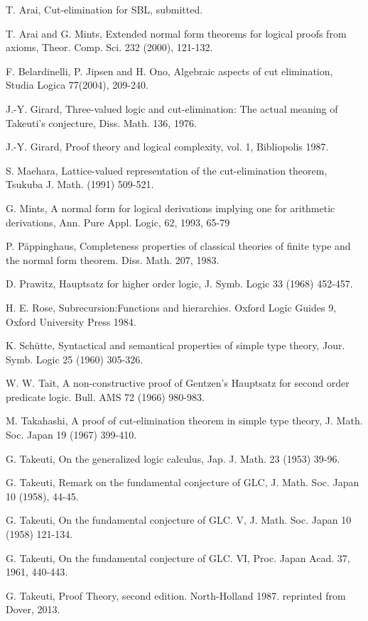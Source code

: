 \documentclass{article}
\begin{document}
\begin{thebibliography}{99}

T. Arai, 
Cut-elimination for {\sf SBL},
submitted.

T. Arai and G. Mints,  Extended normal form theorems for logical proofs from axioms,
Theor. Comp. Sci. 232 (2000), 121-132.

 F. Belardinelli, P. Jipsen and H. Ono,
Algebraic aspects of cut elimination, Studia Logica 77(2004), 209-240.

J.-Y. Girard,
Three-valued logic and cut-elimination: The actual meaning of Takeuti's conjecture,
Diss. Math. 136, 1976.

J.-Y. Girard,
Proof theory and logical complexity, vol. 1,
Bibliopolis 1987.

S. Maehara,
Lattice-valued representation of the cut-elimination theorem,
Tsukuba J. Math. (1991) 509-521.

 G. Mints, 
A normal form for logical derivations implying one for arithmetic derivations, 
Ann. Pure Appl. Logic, 62, 1993, 65-79


P. P\"appinghaus, 
Completeness properties of classical theories of finite type and the normal form theorem.
Diss. Math. 207, 1983.

D. Prawitz,
Hauptsatz for higher order logic,
J. Symb. Logic 33 (1968) 452-457.

H. E. Rose,
Subrecursion:Functions and hierarchies. Oxford Logic Guides 9, Oxford University Press 1984.

K. Sch\"utte,
Syntactical and semantical properties of simple type theory,
Jour. Symb. Logic 25 (1960) 305-326.

W. W. Tait,
A non-constructive proof of Gentzen's Hauptsatz for second order predicate logic.
Bull. AMS 72 (1966) 980-983.

M. Takahashi,
A proof of cut-elimination theorem in simple type theory,
J. Math. Soc. Japan 19 (1967) 399-410.

G. Takeuti, 
On the generalized logic calculus,
Jap. J. Math. 23 (1953) 39-96.

G. Takeuti,
Remark on the fundamental conjecture of GLC,
J. Math. Soc. Japan 10 (1958), 44-45.

G. Takeuti,
On the fundamental conjecture of GLC. V,
J. Math. Soc. Japan 10 (1958) 121-134.

G. Takeuti, 
On the fundamental conjecture of GLC. VI,
Proc. Japan Acad. 37, 1961, 440-443.


G. Takeuti, Proof Theory, second edition. 
North-Holland 1987.
reprinted from Dover, 2013.

\end{thebibliography}
\end{document}
